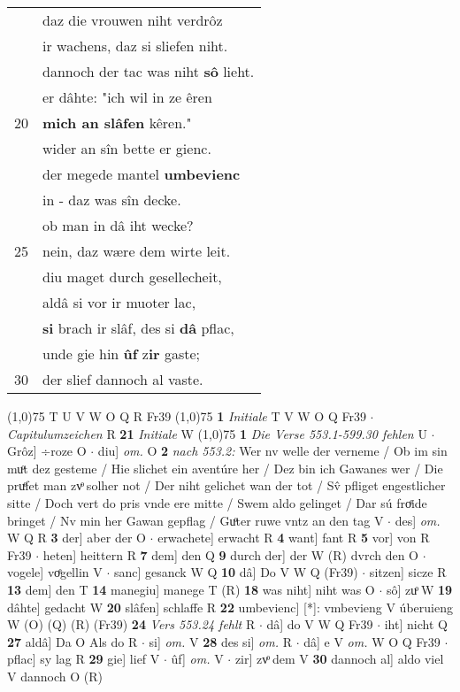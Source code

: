 \documentclass[8pt,a4paper,notitlepage]{article}
\begin{document}
\begin{table}[ht]
\begin{minipage}[t]{0.5\linewidth}
\begin{tabular}{rl}
 & daz die vrouwen niht verdrôz\\ 
 & ir wachens, daz si sliefen niht.\\ 
 & dannoch der tac was niht \textbf{sô} lieht.\\ 
 & er dâhte: "ich wil in ze êren\\ 
20 & \textbf{mich an slâfen} kêren."\\ 
 & wider an sîn bette er gienc.\\ 
 & der megede mantel \textbf{umbevienc}\\ 
 & in - daz was sîn decke.\\ 
 & ob man in dâ iht wecke?\\ 
25 & nein, daz wære dem wirte leit.\\ 
 & diu maget durch gesellecheit,\\ 
 & aldâ si vor ir muoter lac,\\ 
 & \textbf{si} brach ir slâf, des si \textbf{dâ} pflac,\\ 
 & unde gie hin \textbf{ûf} z\textbf{ir} gaste;\\ 
30 & der slief dannoch al vaste.\\ 
\end{tabular}
\scriptsize
\line(1,0){75} \newline
T U V W O Q R Fr39 \newline
\line(1,0){75} \newline
\textbf{1} \textit{Initiale} T V W O Q Fr39   $\cdot$ \textit{Capitulumzeichen} R  \textbf{21} \textit{Initiale} W  \newline
\line(1,0){75} \newline
\textbf{1} \textit{Die Verse 553.1-599.30 fehlen} U   $\cdot$ Grôz] ÷roze O  $\cdot$ diu] \textit{om.} O \textbf{2} \textit{nach 553.2:} Wer nv welle der verneme / Ob im sin muͦt dez gesteme / Hie slichet ein aventúre her / Dez bin ich Gawanes wer / Die pruͤfet man zvͦ solher not / Der niht gelichet wan der tot / Sv̂ pfliget engestlicher sitte / Doch vert do pris vnde ere mitte / Swem aldo gelinget / Dar sú froͤide bringet / Nv min her Gawan gepflag / Guͦter ruwe vntz an den tag V   $\cdot$ des] \textit{om.} W Q R \textbf{3} der] aber der O  $\cdot$ erwachete] erwacht R \textbf{4} want] fant R \textbf{5} vor] von R Fr39  $\cdot$ heten] heittern R \textbf{7} dem] den Q \textbf{9} durch der] der W (R) dvrch den O  $\cdot$ vogele] voͤgellin V  $\cdot$ sanc] gesanck W Q \textbf{10} dâ] Do V W Q (Fr39)  $\cdot$ sitzen] sicze R \textbf{13} dem] den T \textbf{14} manegiu] manege T (R) \textbf{18} was niht] niht was O  $\cdot$ sô] zuͦ W \textbf{19} dâhte] gedacht W \textbf{20} slâfen] schlaffe R \textbf{22} umbevienc] [*]: vmbevieng V úberuieng W (O) (Q) (R) (Fr39) \textbf{24} \textit{Vers 553.24 fehlt} R   $\cdot$ dâ] do V W Q Fr39  $\cdot$ iht] nicht Q \textbf{27} aldâ] Da O Als do R  $\cdot$ si] \textit{om.} V \textbf{28} des si] \textit{om.} R  $\cdot$ dâ] e V \textit{om.} W O Q Fr39  $\cdot$ pflac] sy lag R \textbf{29} gie] lief V  $\cdot$ ûf] \textit{om.} V  $\cdot$ zir] zvͦ dem V \textbf{30} dannoch al] aldo viel V dannoch O (R) \newline
\end{minipage}
\end{table}
\end{document}
